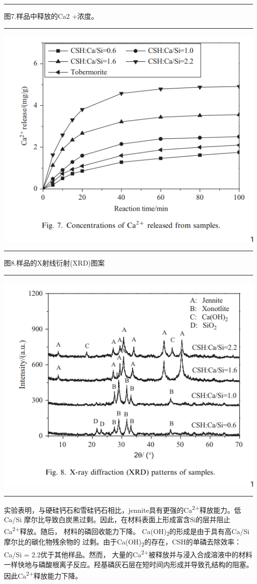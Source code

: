 \documentclass[11pt]{article}
\begin{document}
\noindent\rule{\textwidth}{0.5pt}
图7.样品中释放的Ca2 +浓度。

\noindent\rule{\textwidth}{0.5pt}
\includegraphics[scale=0.5]{fig.7.png}

\noindent\rule{\textwidth}{0.5pt}
图8.样品的X射线衍射(XRD)图案

\noindent\rule{\textwidth}{0.5pt}
\includegraphics[scale=0.5]{fig.8.png}

\noindent\rule{\textwidth}{0.5pt}

实验表明，与硬硅钙石和雪硅钙石相比，jennite具有更强的Ca\textsuperscript{2+}释放能力。低Ca/Si
摩尔比导致白炭黑过剩。因此，在材料表面上形成富含Si的层并阻止Ca\textsuperscript{2+}释放。随后，
材料的磷回收能力下降。 Ca(OH)\textsubscript{2}的形成是由于具有高Ca/Si摩尔比的碳化物残余物的
过剩。由于Ca(OH)\textsubscript{2}的存在，CSH的单磷去除效率：Ca/Si = 2.2优于其他样品。然而，
大量的Ca\textsuperscript{2+}被释放并与浸入合成溶液中的材料一样快地与磷酸根离子反应。羟基磷灰石层在短时间内形成并导致孔结构的阻塞。因此Ca\textsuperscript{2+}释放能力下降。
\end{document}
